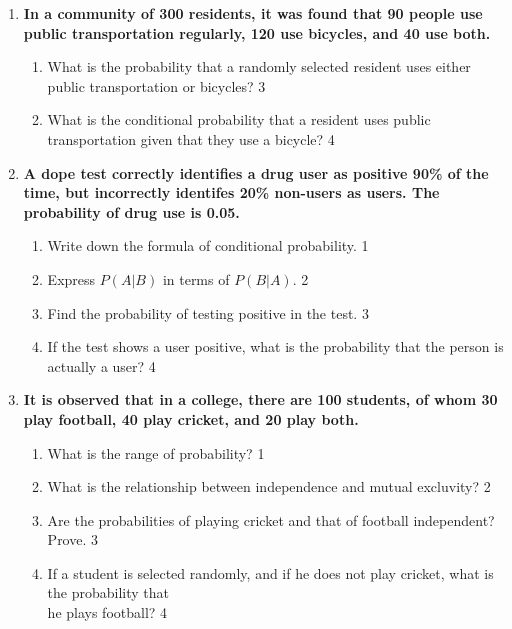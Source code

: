 \documentclass[a4paper,oneside]{book}
\begin{document}
\begin{enumerate}
\item
  \textbf{In a community of 300 residents, it was found that 90 people use public transportation regularly, 120 use bicycles, and 40 use both.}
 
  \begin{enumerate}
    \item
    	What is the probability that a randomly selected resident uses either public transportation or bicycles? \hfill 3
    \item
    	What is the conditional probability that a resident uses public transportation given that they use a bicycle? \hfill 4
  \end{enumerate}

  
  \item
	  \textbf{A dope test correctly identifies a drug user as positive 90\%  of the time, but incorrectly identifes 20\% non-users as users. The probability of drug use is 0.05.} 
  
  \begin{enumerate}
    \item
	Write down the formula of conditional probability. \hfill 1
    \item
	Express $P(A|B)$ in terms of $P(B|A)$. \hfill 2
    \item  
	Find the probability of testing positive in the test. \hfill 3
    \item
	If the test shows a user positive, what is the probability that the person is actually a user? \hfill 4
  \end{enumerate}
  
  \item
  \textbf{It is observed that in a college, there are 100 students, of whom 30 play football, 40 play cricket, and 20 play both.}
 
  \begin{enumerate}
    \item
	What is the range of probability? \hfill 1
    \item
    	What is the relationship between independence and mutual excluvity?  \hfill 2
    \item
    	Are the probabilities of playing cricket and that of football independent? Prove. \hfill 3
     \item
     	If a student is selected randomly, and if he does not play cricket, what is the probability that \\ he plays football? \hfill 4
  \end{enumerate}
  

\end{enumerate}
\end{document}
